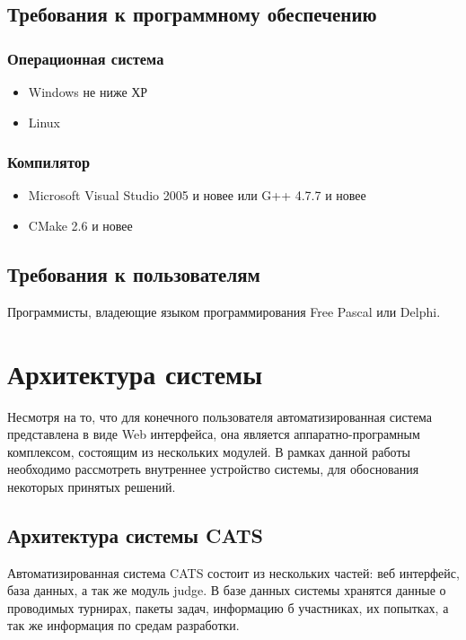 \documentclass{imcs}
\begin{document}
\subsection{Требования к программному обеспечению}

\subsubsection{Операционная система}
\begin{itemize}
    \item Windows не ниже ХР
    \item Linux
\end{itemize}

\subsubsection{Компилятор} 
\begin{itemize}
    \item Microsoft Visual Studio 2005 и новее или G++ 4.7.7 и новее
    \item CMake 2.6 и новее
\end{itemize}
    
\subsection{Требования к пользователям}
Программисты, владеющие языком программирования Free Pascal или Delphi.

\section{Архитектура системы}

Несмотря на то, что для конечного пользователя автоматизированная система представлена в виде Web интерфейса, она является аппаратно-програмным комплексом, состоящим из нескольких модулей.
В рамках данной работы необходимо рассмотреть внутреннее устройство системы, для обоснования некоторых принятых решений.

\subsection{Архитектура системы CATS}
Автоматизированная система CATS состоит из нескольких частей: веб интерфейс, база данных, а так же модуль judge. В базе данных системы хранятся данные о проводимых турнирах, пакеты задач, информацию б участниках, их попытках, а так же информация по средам разработки.
\end{document}
